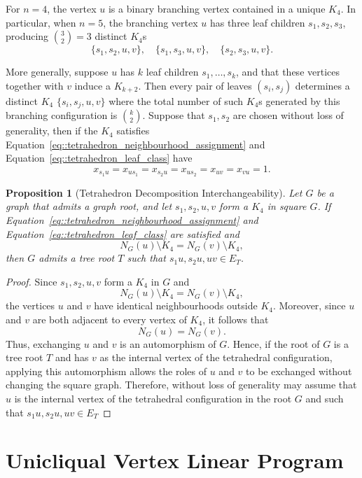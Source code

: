 \documentclass[11pt]{report}
\newtheorem{proposition}{Proposition}
\begin{document}
For $n=4$, the vertex $u$ is a binary branching vertex contained in a unique $K_4$. In particular, when $n=5$, the branching vertex $u$ has three leaf children $s_1,s_2,s_3$, producing $\displaystyle {3 \choose 2} =3$ distinct $K_4$s
\[
\{s_1,s_2,u,v\},\quad \{s_1,s_3,u,v\},\quad \{s_2,s_3,u,v\}.
\]

More generally, suppose $u$ has $k$ leaf children $s_1,\dots,s_k$, and that these vertices together with $v$ induce a $K_{k+2}$. Then every pair of leaves $(s_i,s_j)$ determines a distinct $K_4$ $\{s_i,s_j,u,v\}$ where the total number of such $K_4$s generated by this branching configuration is $ \displaystyle {k \choose 2}$. Suppose that $s_1,s_2$ are chosen without loss of generality, then if the $K_4$ satisfies Equation~\eqref{eq::tetrahedron_neighbourhood_assignment} and Equation~\eqref{eq::tetrahedron_leaf_class} have
\begin{equation} \label{eq::tetrahedron_fix}
  x_{s_1u}=x_{us_1} = x_{s_2u}=x_{us_2} = x_{uv} = x_{vu} = 1. 
\end{equation}

\begin{proposition}[Tetrahedron Decomposition Interchangeability] \label{prop::textrahedron_decomposition_equality}
  Let $G$ be a graph that admits a graph root, and let $s_1,s_2,u,v$ form a $K_4$ in square $G$. If Equation~\eqref{eq::tetrahedron_neighbourhood_assignment} and Equation~\eqref{eq::tetrahedron_leaf_class} are satisfied and
  \[
  N_G(u)\setminus K_4=N_G(v)\setminus K_4,
  \]
  then $G$ admits a tree root $T$ such that $s_1u,s_2u,uv \in E_T$. 
\end{proposition}
\begin{proof}
  Since $s_1,s_2,u,v$ form a $K_4$ in $G$ and
  \[
  N_G(u)\setminus K_4=N_G(v)\setminus K_4,
  \]
  the vertices $u$ and $v$ have identical neighbourhoods outside $K_4$. Moreover, since $u$ and $v$ are both adjacent to every vertex of $K_4$, it follows that
  \[
  N_G(u)=N_G(v).
  \]
  Thus, exchanging $u$ and $v$ is an automorphism of $G$. Hence, if the root of $G$ is a tree root $T$ and has $v$ as the internal vertex of the tetrahedral configuration, applying this automorphism allows the roles of $u$ and $v$ to be exchanged without changing the square graph. Therefore, without loss of generality may assume that $u$ is the internal vertex of the tetrahedral configuration in the root $G$ and such that $s_1u,s_2u,uv \in E_T$
\end{proof}

\section{Unicliqual Vertex Linear Program} \label{sec::unicliqual_vertex_linear_program}
\end{document}
